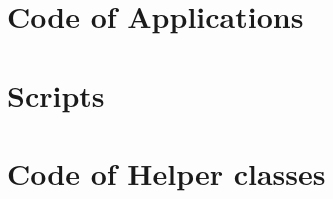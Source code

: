 \setlength{\oddsidemargin}{0.5in}
\setlength{\evensidemargin}{0.5in}
\setlength{\topmargin}{-0.2in}
\addtolength{\textwidth}{1in}
\addtolength{\textheight}{1in}

\begin{landscape}
\begin{multicols}{2}


\section{Code of Applications}






\section{Scripts}


\pagebreak
\section{Code of Helper classes}











\end{multicols}
\end{landscape}
